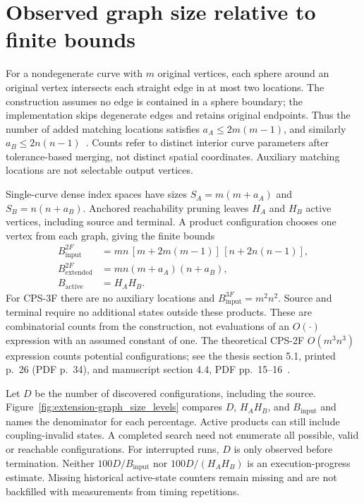 \section{Observed graph size relative to finite bounds}
For a nondegenerate curve with $m$ original vertices, each sphere around an original vertex intersects each straight edge in at most two locations. The construction assumes no edge is contained in a sphere boundary; the implementation skips degenerate edges and retains original endpoints. Thus the number of added matching locations satisfies $a_A\leq 2m(m-1)$, and similarly $a_B\leq 2n(n-1)$~\cite[Observation 4, printed p.~18 (PDF p.~26)]{thesis}. Counts refer to distinct interior curve parameters after tolerance-based merging, not distinct spatial coordinates. Auxiliary matching locations are not selectable output vertices.

Single-curve dense index spaces have sizes $S_A=m(m+a_A)$ and $S_B=n(n+a_B)$. Anchored reachability pruning leaves $H_A$ and $H_B$ active vertices, including source and terminal. A product configuration chooses one vertex from each graph, giving the finite bounds
\begin{align}
B_{\mathrm{input}}^{2F}&=mn\,[m+2m(m-1)]\,[n+2n(n-1)],\\
B_{\mathrm{extended}}^{2F}&=mn(m+a_A)(n+a_B),\\
B_{\mathrm{active}}&=H_AH_B.
\end{align}
For CPS-3F there are no auxiliary locations and $B_{\mathrm{input}}^{3F}=m^2n^2$. Source and terminal require no additional states outside these products. These are combinatorial counts from the construction, not evaluations of an $O(\cdot)$ expression with an assumed constant of one. The theoretical CPS-2F $O(m^3n^3)$ expression counts potential configurations; see the thesis section 5.1, printed p.~26 (PDF p.~34), and manuscript section 4.4, PDF pp.~15--16~\cite{thesis,manuscript}.

Let $D$ be the number of discovered configurations, including the source. Figure~\ref{fig:extension-graph_size_levels} compares $D$, $H_AH_B$, and $B_{\mathrm{input}}$ and names the denominator for each percentage. Active products can still include coupling-invalid states. A completed search need not enumerate all possible, valid or reachable configurations. For interrupted runs, $D$ is only observed before termination. Neither $100D/B_{\mathrm{input}}$ nor $100D/(H_AH_B)$ is an execution-progress estimate. Missing historical active-state counters remain missing and are not backfilled with measurements from timing repetitions.

